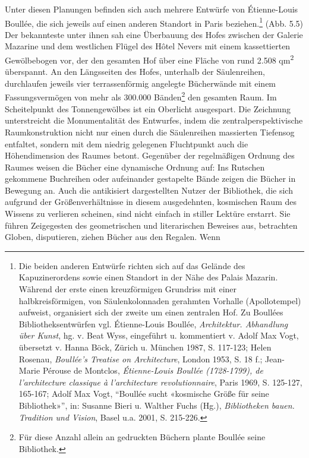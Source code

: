 Unter diesen Planungen befinden sich auch mehrere Entwürfe von
Étienne-Louis Boullée, die sich jeweils auf einen anderen Standort in
Paris beziehen.\footnote{Die beiden anderen Entwürfe richten sich auf
  das Gelände des Kapuzinerordens sowie einen Standort in der Nähe des
  Palais Mazarin. Während der erste einen kreuzförmigen Grundriss mit
  einer halbkreisförmigen, von Säulenkolonnaden gerahmten Vorhalle
  (Apollotempel) aufweist, organisiert sich der zweite um einen
  zentralen Hof. Zu Boullées Bibliotheksentwürfen vgl. Étienne-Louis
  Boullée, \emph{Architektur. Abhandlung über Kunst}, hg. v. Beat Wyss,
  eingeführt u. kommentiert v. Adolf Max Vogt, übersetzt v. Hanna Böck,
  Zürich u. München 1987, S. 117-123; Helen Rosenau, \emph{Boullée's
  Treatise on Architecture}, London 1953, S. 18 f.; Jean-Marie Pérouse
  de Montclos, \emph{Étienne-Louis Boullée (1728-1799), de
  l'architecture classique à l'architecture revolutionnaire}, Paris
  1969, S. 125-127, 165-167; Adolf Max Vogt, \enquote{Boullée sucht
  «kosmische Größe für seine Bibliothek»}, in: Susanne Bieri u. Walther
  Fuchs (Hg.), \emph{Bibliotheken bauen. Tradition und Vision}, Basel
  u.a. 2001, S. 215-226.} (Abb. 5.5) Der bekannteste unter ihnen sah eine
Überbauung des Hofes zwischen der Galerie Mazarine und dem westlichen
Flügel des Hôtel Nevers mit einem kassettierten Gewölbebogen vor, der
den gesamten Hof über eine Fläche von rund 2.508 qm\textsuperscript{2}
überspannt. An den Längsseiten des Hofes, unterhalb der Säulenreihen,
durchlaufen jeweils vier terrassenförmig angelegte Bücherwände mit einem
Fassungsvermögen von mehr als 300.000 Bänden\footnote{Für diese Anzahl
  allein an gedruckten Büchern plante Boullée seine Bibliothek.} den
gesamten Raum. Im Scheitelpunkt des Tonnengewölbes ist ein Oberlicht
ausgespart. Die Zeichnung unterstreicht die Monumentalität des
Entwurfes, indem die zentralperspektivische Raumkonstruktion nicht nur
einen durch die Säulenreihen massierten Tiefensog entfaltet, sondern mit
dem niedrig gelegenen Fluchtpunkt auch die Höhendimension des Raumes
betont. Gegenüber der regelmäßigen Ordnung des Raumes weisen die Bücher
eine dynamische Ordnung auf: Ins Rutschen gekommene Buchreihen oder
aufeinander gestapelte Bände zeigen die Bücher in Bewegung an. Auch die
antikisiert dargestellten Nutzer der Bibliothek, die sich aufgrund der
Größenverhältnisse in diesem ausgedehnten, kosmischen Raum des Wissens
zu verlieren scheinen, sind nicht einfach in stiller Lektüre erstarrt.
Sie führen Zeigegesten des geometrischen und literarischen Beweises aus,
betrachten Globen, disputieren, ziehen Bücher aus den Regalen. Wenn
